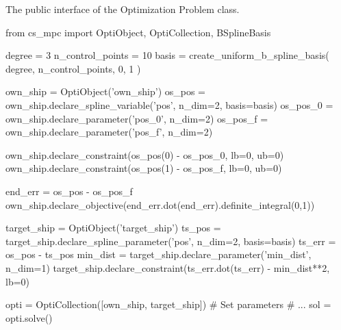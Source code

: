\begin{algorithm}
\caption{The public interface of the Optimization Problem class.}
\label{alg:optimization-problem-class}
\begin{python}
from cs_mpc import OptiObject, OptiCollection, BSplineBasis


degree = 3
n_control_points = 10
basis = create_uniform_b_spline_basis(
    degree, n_control_points, 0, 1
)

own_ship = OptiObject('own_ship')
os_pos = own_ship.declare_spline_variable('pos', n_dim=2, basis=basis)
os_pos_0 = own_ship.declare_parameter('pos_0', n_dim=2)
os_pos_f = own_ship.declare_parameter('pos_f', n_dim=2)

own_ship.declare_constraint(os_pos(0) - os_pos_0, lb=0, ub=0)
own_ship.declare_constraint(os_pos(1) - os_pos_f, lb=0, ub=0)

end_err = os_pos - os_pos_f
own_ship.declare_objective(end_err.dot(end_err).definite_integral(0,1))


target_ship = OptiObject('target_ship')
ts_pos = target_ship.declare_spline_parameter('pos', n_dim=2, basis=basis)
ts_err = os_pos - ts_pos
min_dist = target_ship.declare_parameter('min_dist', n_dim=1)
target_ship.declare_constraint(ts_err.dot(ts_err) - min_dist**2, lb=0)


opti = OptiCollection([own_ship, target_ship])
# Set parameters
# ...
sol = opti.solve()

\end{python}
\end{algorithm}